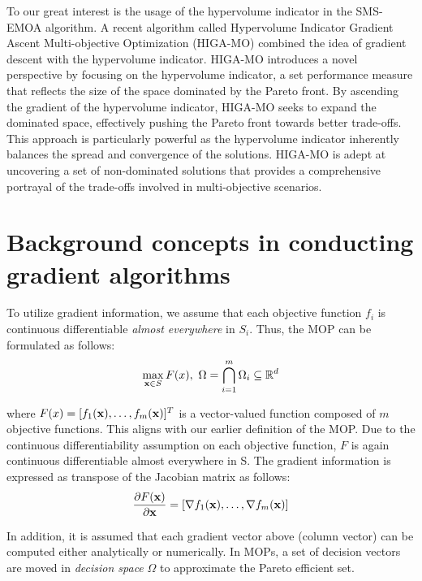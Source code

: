 \documentclass[%
 reprint,
 amsmath,amssymb,
 aps,
]{revtex4-2}
\newcommand{\bb}[1]
{\mathbb{#1}}
\begin{document}
To our great interest is the usage of the hypervolume indicator in the SMS-EMOA algorithm. A recent algorithm called Hypervolume Indicator Gradient Ascent
Multi-objective Optimization (HIGA-MO) combined the idea of gradient descent with the hypervolume indicator. HIGA-MO introduces a novel perspective by focusing on the hypervolume indicator, a set performance measure that reflects the size of the space dominated by the Pareto front. By ascending the gradient of the hypervolume indicator, HIGA-MO seeks to expand the dominated space, effectively pushing the Pareto front towards better trade-offs. This approach is particularly powerful as the hypervolume indicator inherently balances the spread and convergence of the solutions. HIGA-MO is adept at uncovering a set of non-dominated solutions that provides a comprehensive portrayal of the trade-offs involved in multi-objective scenarios.

\section{\label{sec:level1}	
Background concepts in conducting gradient algorithms}

To utilize gradient information, we assume that each objective function $f_i$ is continuous differentiable \textit{almost everywhere} in $S_i$. Thus, the MOP can be formulated as follows: \cite{HIGA-MO}
\begin{equation}
\max_{\bold{x}\in S}F(x), \ \Omega = \bigcap_{i=1}^m \Omega_i \subseteq \bb{R}^d
\end{equation}

where $F(x) = [f_1(\bold{x}), \dots, f_m(\bold{x})]^T$ is a vector-valued function composed of $m$ objective functions. This aligns with our earlier definition of the MOP. Due to the continuous differentiability assumption on each objective function, $F$ is
again continuous differentiable almost everywhere in S. The gradient information
is expressed as transpose of the Jacobian matrix as follows:
\begin{equation}
\frac{\partial F(\bold{x})}{\partial \bold{x}}
=
[
\nabla f_1(\bold{x}), \dots, \nabla f_m(\bold{x})]
\end{equation}

In addition, it is assumed that each gradient vector above (column vector) can be
computed either analytically or numerically. In MOPs, a set of decision vectors
are moved in \textit{decision space} $\Omega$ to approximate the Pareto efficient set.
\end{document}
